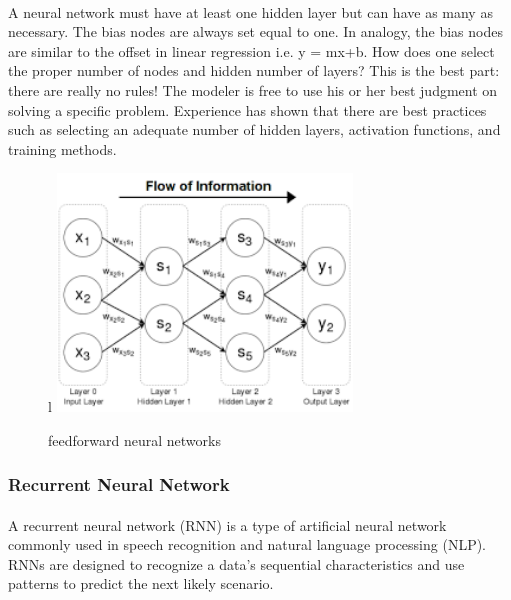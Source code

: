 \paragraph{}A neural network must have at least one hidden layer but can have as many as necessary. The bias nodes are always set equal to one. In analogy, the bias nodes are similar to the offset in linear regression 
i.e. y = mx+b. How does one select the proper number of nodes and hidden number of layers? This is the best part: there are really no rules! The modeler is free to use his or her best judgment on solving a specific problem. Experience has shown that there are best practices such as selecting an adequate number of hidden layers, activation functions, and training methods.
\begin{figure}{l}
	\centering
	\includegraphics[width=0.7\textwidth]{ff.png}
	\caption{feedforward neural networks}
\end{figure}
\subsubsection{Recurrent Neural Network
}
\paragraph{}
A recurrent neural network (RNN) is a type of artificial neural network commonly used in speech recognition and natural language processing (NLP). RNNs are designed to recognize a data's sequential characteristics and use patterns to predict the next likely scenario.



